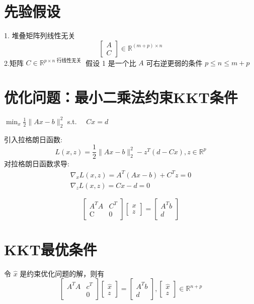\section{先验假设}

1. 堆叠矩阵列线性无关
$$
\left[\begin{array}{l}
A \\
C
\end{array}\right] \in \mathbb{R}^{(m+p) \times n}
$$
2.矩阵 $ C \in \mathbb{R}^{p \times n \text { 行线性无关 }} $
假设 1 是一个比 $ A $ 可右逆更弱的条件 $ p \leq n \leq m+p $

\section{优化问题：最小二乘法约束KKT条件}

$ \min _{x} \frac{1}{2}\|A x-b\|_{2}^{2} $
s.t. $ \quad C x=d $

引入拉格朗日函数:
$$
L(x, z)=\frac{1}{2}\|A x-b\|_{2}^{2}-z^{T}(d-C x), z \in \mathbb{R}^{p}
$$
对拉格朗日函数求导:
$$
\begin{array}{l}
\nabla_{x} L(x, z)=A^{T}(A x-b)+C^{T} z=0 \\
\nabla_{z} L(x, z)=C x-d=0
\end{array}
$$

$$ \left[\begin{array}{cc}A^{T} A & C^{T} \\ \mathrm{C} & 0\end{array}\right]\left[\begin{array}{l}x \\ z\end{array}\right]=\left[\begin{array}{l}A^{T} b \\ d\end{array}\right] $$

\section{KKT最优条件}

\begin{theorem}
    令 $ \hat{x} $ 是约束优化问题的解，则有
$$
\left[\begin{array}{cc}
A^{T} A & c^{T} \\
& 0
\end{array}\right]\left[\begin{array}{l}
\hat{x} \\
z
\end{array}\right]=\left[\begin{array}{l}
A^{T} b \\
d
\end{array}\right],\left[\begin{array}{l}
\hat{x} \\
z
\end{array}\right] \in \mathbb{R}^{n+p}
$$
\end{theorem}


